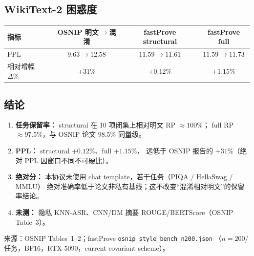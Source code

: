 \documentclass[11pt,a4paper]{article}
\begin{document}
\vspace{0.6em}

\subsection*{WikiText-2 困惑度}

\begin{center}
\renewcommand{\arraystretch}{1.2}
\small
\begin{tabular}{@{}lccc@{}}
\toprule
\rowcolor{headerbg}
指标 & OSNIP 明文$\to$混淆 & fastProve structural & fastProve full \\
\midrule
PPL
  & $9.63\to12.58$
  & $11.59\to11.61$
  & $11.59\to11.73$ \\
相对增幅 $\Delta\%$
  & \textbf{$+31\%$}
  & \textbf{$+0.12\%$}
  & \textbf{$+1.15\%$} \\
\bottomrule
\end{tabular}
\end{center}

\vspace{0.7em}
\subsection*{结论}
\begin{enumerate}
  \item \textbf{任务保留率：} structural 在 10 项闭集上相对明文 RP $\approx 100\%$；
    full RP $\approx 97.5\%$，与 OSNIP 论文 $98.5\%$ 同量级。
  \item \textbf{PPL：} structural $+0.12\%$、full $+1.15\%$，
    远低于 OSNIP 报告的 $+31\%$（绝对 PPL 因窗口不同不可硬比）。
  \item \textbf{绝对分：} 本协议未使用 chat template，若干任务（PIQA / HellaSwag / MMLU）
    绝对准确率低于论文非私有基线；这不改变“混淆相对明文”的保留率结论。
  \item \textbf{未测：} 隐私 KNN-ASR、CNN/DM 摘要 ROUGE/BERTScore（OSNIP Table~3）。
\end{enumerate}

\vspace{0.3em}
{\scriptsize\color{note}
来源：OSNIP Tables~1--2；fastProve \texttt{osnip\_style\_bench\_n200.json}
（$n{=}200$/任务，BF16，RTX 5090，current covariant scheme）。
}
\end{document}
